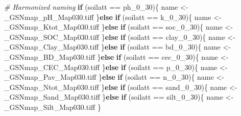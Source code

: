 \documentclass[
  10pt,
  b5paper,
  oneside]{book}
\newenvironment{Shaded}{\begin{snugshade}}{\end{snugshade}}
\newcommand{\CommentTok}[1]{\textcolor[rgb]{0.56,0.35,0.01}{\textit{#1}}}
\newcommand{\ControlFlowTok}[1]{\textcolor[rgb]{0.13,0.29,0.53}{\textbf{#1}}}
\newcommand{\NormalTok}[1]{#1}
\newcommand{\OtherTok}[1]{\textcolor[rgb]{0.56,0.35,0.01}{#1}}
\newcommand{\SpecialCharTok}[1]{\textcolor[rgb]{0.00,0.00,0.00}{#1}}
\newcommand{\StringTok}[1]{\textcolor[rgb]{0.31,0.60,0.02}{#1}}
\begin{document}
\begin{Shaded}
\begin{Highlighting}[]
\CommentTok{\# Harmonized naming }
\ControlFlowTok{if}\NormalTok{ (soilatt }\SpecialCharTok{==} \StringTok{\textquotesingle{}ph\_0\_30\textquotesingle{}}\NormalTok{)\{}
\NormalTok{  name }\OtherTok{\textless{}{-}}\StringTok{\textquotesingle{}\_GSNmap\_pH\_Map030.tiff\textquotesingle{}}
\NormalTok{\}}\ControlFlowTok{else} \ControlFlowTok{if}\NormalTok{ (soilatt }\SpecialCharTok{==} \StringTok{\textquotesingle{}k\_0\_30\textquotesingle{}}\NormalTok{)\{}
\NormalTok{  name }\OtherTok{\textless{}{-}}\StringTok{\textquotesingle{}\_GSNmap\_Ktot\_Map030.tiff\textquotesingle{}}
\NormalTok{\}}\ControlFlowTok{else} \ControlFlowTok{if}\NormalTok{ (soilatt }\SpecialCharTok{==} \StringTok{\textquotesingle{}soc\_0\_30\textquotesingle{}}\NormalTok{)\{}
\NormalTok{  name }\OtherTok{\textless{}{-}}\StringTok{\textquotesingle{}\_GSNmap\_SOC\_Map030.tiff\textquotesingle{}}
\NormalTok{\}}\ControlFlowTok{else} \ControlFlowTok{if}\NormalTok{ (soilatt }\SpecialCharTok{==} \StringTok{\textquotesingle{}clay\_0\_30\textquotesingle{}}\NormalTok{)\{}
\NormalTok{  name }\OtherTok{\textless{}{-}}\StringTok{\textquotesingle{}\_GSNmap\_Clay\_Map030.tiff\textquotesingle{}}
\NormalTok{\}}\ControlFlowTok{else} \ControlFlowTok{if}\NormalTok{ (soilatt }\SpecialCharTok{==} \StringTok{\textquotesingle{}bd\_0\_30\textquotesingle{}}\NormalTok{)\{}
\NormalTok{  name }\OtherTok{\textless{}{-}}\StringTok{\textquotesingle{}\_GSNmap\_BD\_Map030.tiff\textquotesingle{}}
\NormalTok{\}}\ControlFlowTok{else} \ControlFlowTok{if}\NormalTok{ (soilatt }\SpecialCharTok{==} \StringTok{\textquotesingle{}cec\_0\_30\textquotesingle{}}\NormalTok{)\{}
\NormalTok{  name }\OtherTok{\textless{}{-}}\StringTok{\textquotesingle{}\_GSNmap\_CEC\_Map030.tiff\textquotesingle{}}
\NormalTok{\}}\ControlFlowTok{else} \ControlFlowTok{if}\NormalTok{ (soilatt }\SpecialCharTok{==} \StringTok{\textquotesingle{}p\_0\_30\textquotesingle{}}\NormalTok{)\{}
\NormalTok{  name }\OtherTok{\textless{}{-}}\StringTok{\textquotesingle{}\_GSNmap\_Pav\_Map030.tiff\textquotesingle{}}
\NormalTok{\}}\ControlFlowTok{else} \ControlFlowTok{if}\NormalTok{ (soilatt }\SpecialCharTok{==} \StringTok{\textquotesingle{}n\_0\_30\textquotesingle{}}\NormalTok{)\{}
\NormalTok{  name }\OtherTok{\textless{}{-}}\StringTok{\textquotesingle{}\_GSNmap\_Ntot\_Map030.tiff\textquotesingle{}}
\NormalTok{\}}\ControlFlowTok{else} \ControlFlowTok{if}\NormalTok{ (soilatt }\SpecialCharTok{==} \StringTok{\textquotesingle{}sand\_0\_30\textquotesingle{}}\NormalTok{)\{}
\NormalTok{  name }\OtherTok{\textless{}{-}}\StringTok{\textquotesingle{}\_GSNmap\_Sand\_Map030.tiff\textquotesingle{}}
\NormalTok{\}}\ControlFlowTok{else} \ControlFlowTok{if}\NormalTok{ (soilatt }\SpecialCharTok{==} \StringTok{\textquotesingle{}silt\_0\_30\textquotesingle{}}\NormalTok{)\{}
\NormalTok{  name }\OtherTok{\textless{}{-}}\StringTok{\textquotesingle{}\_GSNmap\_Silt\_Map030.tiff\textquotesingle{}}
\NormalTok{\}}


\end{Highlighting}
\end{Shaded}
\end{document}
